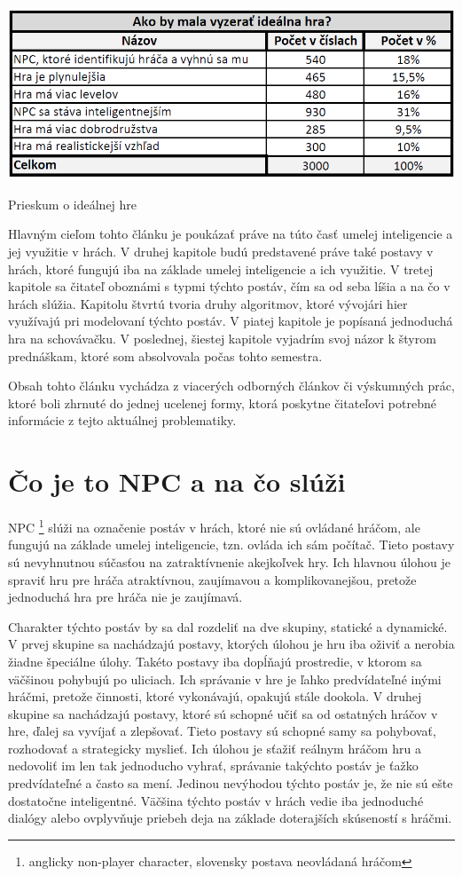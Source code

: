 \documentclass[10pt,twoside,slovak,a4paper]{article}
\begin{document}
\begin{table}[tbh]
\center \includegraphics[scale=0.5]{prieskum.png}
\caption{Prieskum o ideálnej hre}
\label{t:t1}
\end{table}

Hlavným cieľom tohto článku je poukázať práve na túto časť umelej inteligencie a jej využitie v hrách. V druhej kapitole budú predstavené práve také postavy v hrách, ktoré fungujú iba na základe umelej inteligencie a ich využitie. V tretej kapitole sa čitateľ oboznámi s typmi týchto postáv, čím sa od seba líšia a na čo v hrách slúžia. Kapitolu štvrtú tvoria druhy algoritmov, ktoré vývojári hier využívajú pri modelovaní týchto postáv. V piatej kapitole je popísaná jednoduchá hra na schovávačku. V poslednej, šiestej kapitole vyjadrím svoj názor k štyrom prednáškam, ktoré som absolvovala počas tohto semestra. 

Obsah tohto článku vychádza z viacerých odborných článkov či výskumných prác, ktoré boli zhrnuté do jednej ucelenej formy, ktorá poskytne čitateľovi potrebné informácie z tejto aktuálnej problematiky. 


\section{Čo je to NPC a na čo slúži}  \label{nejaka}
\quad NPC \footnote{anglicky non-player character, slovensky postava neovládaná hráčom} slúži na označenie postáv v hrách, ktoré nie sú ovládané hráčom, ale fungujú na základe umelej inteligencie, tzn. ovláda ich sám počítač. Tieto postavy sú nevyhnutnou súčasťou na zatraktívnenie akejkoľvek hry. Ich hlavnou úlohou je spraviť hru pre hráča atraktívnou, zaujímavou a komplikovanejšou, pretože jednoduchá hra pre hráča nie je zaujímavá. 

\quad Charakter týchto postáv by sa dal rozdeliť na dve skupiny, statické a dynamické. V prvej skupine sa nachádzajú postavy, ktorých úlohou je hru iba oživiť a nerobia žiadne špeciálne úlohy. Takéto postavy iba dopĺňajú prostredie, v ktorom sa väčšinou pohybujú po uliciach. Ich správanie v hre je ľahko predvídateľné inými hráčmi, pretože činnosti, ktoré vykonávajú, opakujú stále dookola. V druhej skupine sa nachádzajú postavy, ktoré sú schopné učiť sa od ostatných hráčov v hre, ďalej sa vyvíjať a zlepšovať. \cite{hernaAI} Tieto postavy sú schopné samy sa pohybovať, rozhodovať a strategicky myslieť. \cite{rozhod} Ich úlohou je sťažiť reálnym hráčom hru a nedovoliť im len tak jednoducho vyhrať, správanie takýchto postáv je ťažko predvídateľné a často sa mení. Jedinou nevýhodou týchto postáv je, že nie sú ešte dostatočne inteligentné. Väčšina týchto postáv v hrách vedie iba jednoduché dialógy alebo ovplyvňuje priebeh deja na základe doterajších skúseností s hráčmi. 
\end{document}
